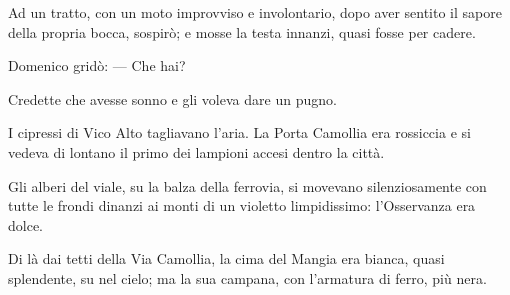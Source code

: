 Ad un tratto, con un moto improvviso e involontario, dopo aver sentito il sapore della propria bocca, sospirò; e mosse la testa innanzi, quasi fosse per cadere.

Domenico gridò: — Che hai?

Credette che avesse sonno e gli voleva dare un pugno.

I cipressi di Vico Alto tagliavano l’aria. La Porta Camollia era rossiccia e si vedeva di lontano il primo dei lampioni accesi dentro la città.

Gli alberi del viale, su la balza della ferrovia, si movevano silenziosamente con tutte le frondi dinanzi ai monti di un violetto limpidissimo: l’Osservanza era dolce.

Di là dai tetti della Via Camollia, la cima del Mangia era bianca, quasi splendente, su nel cielo; ma la sua campana, con l’armatura di ferro, più nera.
